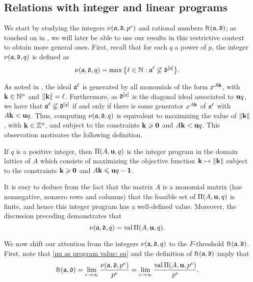 \documentclass{amsart}
\begin{document}
\subsection{Relations with integer and linear programs}
We start by studying the integers $\nu(\mathfrak{a}, \mathfrak{d}, p^e)$ and rational numbers $\operatorname{ft}(\mathfrak{a}, \mathfrak{d})$; as touched on in , we will later be able to use our results in this restrictive context to obtain more general ones.
First, recall that for each $q$ a power of $p$, the integer $\nu(\mathfrak{a}, \mathfrak{d}, q)$ is defined as
\[\nu(\mathfrak{a},\mathfrak{d},q) = \max\big\{\ell \in \mathbb{N} : \mathfrak{a}^{\ell} \not\subseteq \mathfrak{d}^{[q]}\big\}.\]

As noted in ,  the ideal $\mathfrak{a}^{\ell}$ is generated by all monomials of the form $x^{A\mathbf{k}}$, with $\mathbf{k}\in \mathbb{N}^n$ and $\| \mathbf{k} \| = \ell$.  Furthermore, as $\mathfrak{d}^{[q]}$ is the diagonal ideal associated to $\mathbf{u}q$, we have that $\mathfrak{a}^{\ell} \not\subseteq \mathfrak{d}^{[q]}$ if and only if there is some generator $x^{A \mathbf{k}}$ of $\mathfrak{a}^{\ell}$ with $A\mathbf{k} < \mathbf{u}q$.  Thus, computing $\nu(\mathfrak{a},\mathfrak{d},q)$ is equivalent to maximizing the value of $\| \mathbf{k} \|$, with $\mathbf{k} \in \mathbb{Z}^n$, and subject to the constraints $\mathbf{k} \geqslant \mathbf{0}$ and $A\mathbf{k} < \mathbf{u}q$.
This observation motivates the following definition.

\begin{definition}
\label{IP: D}
   If $q$ is a positive integer, then $\Pi(A, \mathbf{u}, q)$ is the integer program in the domain lattice of $A$ which consists of maximizing the objective function $\mathbf{k} \mapsto \| \mathbf{k} \|$ subject to the constraints $\mathbf{k} \geqslant \mathbf{0}$ and $A \mathbf{k} \leqslant \mathbf{u}q - \mathbf{1}$.
\end{definition}

It is easy to deduce from the fact that the matrix $A$ is a monomial matrix (\ie has nonnegative, nonzero rows and columns) that the feasible set of $\Pi(A,\mathbf{u},q)$ is finite, and hence this integer program has a well-defined value.
Moreover, the discussion preceding  demonstrates that
%
\begin{equation}
\label{nu as program value: eq}
\nu(\mathfrak{a},\mathfrak{d},q) = \operatorname{val} \Pi(A,\mathbf{u},q).
\end{equation}

We now shift our attention from the integers $\nu(\mathfrak{a}, \mathfrak{d}, q)$ to the $F$-threshold $\operatorname{ft}(\mathfrak{a}, \mathfrak{d})$.  First, note that \eqref{nu as program value: eq} and the definition of $\operatorname{ft}(\mathfrak{a}, \mathfrak{d})$ imply that
%
\begin{equation}
\label{ft as limit of normalized program values: eq}
\operatorname{ft}(\mathfrak{a}, \mathfrak{d}) = \lim_{e\to\infty} \frac{\nu(\mathfrak{a},\mathfrak{d},p^e)}{p^e} = \lim_{e\to\infty} \frac{\operatorname{val} \Pi(A,\mathbf{u},p^e)}{p^e}.
\end{equation}
\end{document}
